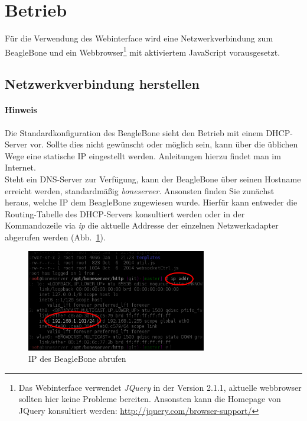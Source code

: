\section{Betrieb}
Für die Verwendung des Webinterface wird eine Netzwerkverbindung zum BeagleBone und ein Webbrowser\footnote{Das Webinterface verwendet \emph{JQuery} in der Version 2.1.1, aktuelle webbrowser sollten hier keine Probleme bereiten. Ansonsten kann die Homepage von JQuery konsultiert werden: \url{http://jquery.com/browser-support/}} mit aktiviertem JavaScript vorausgesetzt.


\subsection{Netzwerkverbindung herstellen}

\paragraph{Hinweis} Die Standardkonfiguration des BeagleBone sieht den Betrieb mit einem DHCP-Server vor. Sollte dies nicht gewünscht oder möglich sein, kann über die üblichen Wege eine statische IP eingestellt werden. Anleitungen hierzu findet man im Internet.\\

Steht ein DNS-Server zur Verfügung, kann der BeagleBone über seinen Hostname erreicht werden, standardmäßig \textit{boneserver}. Ansonsten finden Sie zunächst heraus, welche IP dem BeagleBone zugewiesen wurde. Hierfür kann entweder die Routing-Tabelle des DHCP-Servers konsultiert werden oder in der Kommandozeile via \emph{ip} die aktuelle Addresse der einzelnen Netzwerkadapter abgerufen werden \mbox{(Abb. \ref{fig:getBeagleBoneIP})}.

\begin{figure}[ht]
	\centering
	\includegraphics[width=0.7\textwidth]{images/getBeagleBoneIP.png}
	\caption{IP des BeagleBone abrufen}
	\label{fig:getBeagleBoneIP}
\end{figure}


